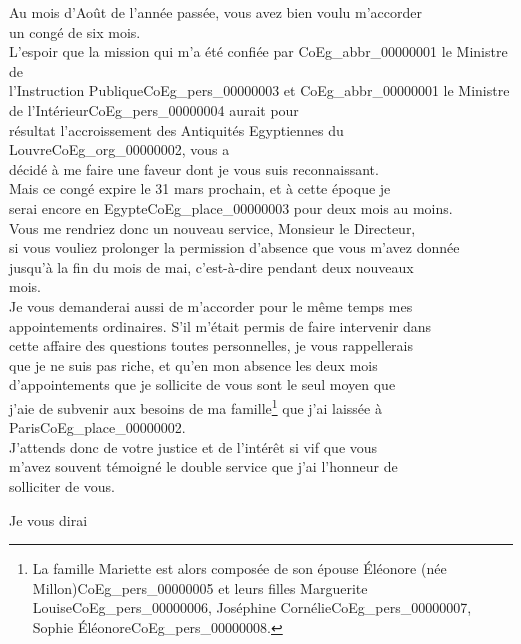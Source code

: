 \documentclass{book}
\begin{document}
\par Au mois d’Août de l’année passée, vous avez bien voulu m’accorder\\
un congé de six mois.\\
\indent L’espoir que la mission qui m’a été confiée par \gls{CoEg_abbr_00000001} le Ministre de
\\l’Instruction Publique\gls{CoEg_pers_00000003} et \gls{CoEg_abbr_00000001} le Ministre de l’Intérieur\gls{CoEg_pers_00000004} aurait pour\\
résultat l’accroissement des Antiquités Egyptiennes du Louvre\gls{CoEg_org_00000002}, vous a\\
décidé à me faire une faveur dont je vous suis reconnaissant.\\
\indent Mais ce congé expire le 31 mars prochain, et à cette époque je\\
serai encore en Egypte\gls{CoEg_place_00000003} pour deux mois au moins.\\
\indent Vous me rendriez donc un nouveau service, Monsieur le Directeur,\\
si vous vouliez prolonger la permission d’absence que vous m’avez donnée\\
jusqu’à la fin du mois de mai, c’est-à-dire pendant deux nouveaux\\
mois.\\
\indent Je vous demanderai aussi de m’accorder pour le même temps mes\\
appointements ordinaires. S’il m’était permis de faire intervenir dans\\
cette affaire des questions toutes personnelles, je vous rappellerais\\
que je ne suis pas riche, et qu’en mon absence les deux mois\\
d’appointements que je sollicite de vous sont le seul moyen que\\
j’aie de subvenir aux besoins de ma famille\footnote{La famille Mariette est alors composée de son épouse Éléonore (née Millon)\gls{CoEg_pers_00000005} et leurs filles Marguerite Louise\gls{CoEg_pers_00000006}, Joséphine Cornélie\gls{CoEg_pers_00000007}, Sophie Éléonore\gls{CoEg_pers_00000008}.} que j’ai laissée à Paris\gls{CoEg_place_00000002}.\\
\indent J’attends donc de votre justice et de l’intérêt si vif que vous\\
m’avez souvent témoigné le double service que j’ai l’honneur de\\
solliciter de vous.
\begin{flushright}Je vous dirai\end{flushright}
\end{document}
